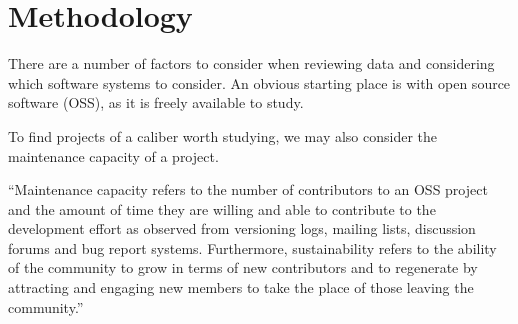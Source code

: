 \chapter{Methodology} \label{chapterMethodology}


There are a number of factors to consider when reviewing data and considering which software systems to consider. An obvious starting place is with open source software (OSS), as it is freely available to study.

To find projects of a caliber worth studying, we may also consider the maintenance capacity of a project.

\vspace{0.25cm}
\begin{displayquote}
  ``Maintenance capacity refers to the number of contributors to an OSS project and the amount of time they are willing and able to contribute to the development effort as observed from versioning logs, mailing lists, discussion forums and bug report systems. Furthermore, sustainability refers to the ability of the community to grow in terms of new contributors and to regenerate by attracting and engaging new members to take the place of those leaving the community.'' \cite{adewumi:2016}
\end{displayquote}
\vspace{0.25cm}
